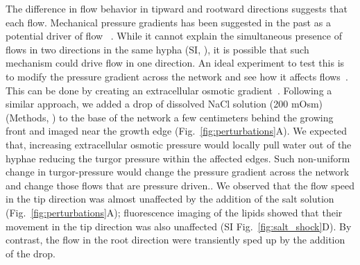 
The difference in flow behavior in tipward and rootward directions suggests that each flow. Mechanical pressure gradients has been suggested in the past as a potential driver of flow ~\cite{heaton_growth-induced_2010,lew_mass_2005,lew_how_2011}. While it cannot explain the simultaneous presence of flows in two directions in the same hypha (SI, ), it is possible that such mechanism could drive flow in one direction. 
An ideal experiment to test this is to modify the pressure gradient across the network and see how it affects flows~\cite{lew_mass_2005}. This can be done by creating an extracellular osmotic gradient~\cite{lew_mass_2005}.
Following a similar approach, we added a drop of dissolved NaCl solution (200 mOsm) (Methods, ) to the base of the network a few centimeters behind the growing front and imaged near the growth edge (Fig.~\ref{fig:perturbations}A).
We expected that, increasing extracellular osmotic pressure would locally pull water out of the hyphae reducing the turgor pressure within the affected edges. Such non-uniform change in turgor-pressure would change the pressure gradient across the network and change those flows that are pressure driven..
We observed that the flow speed in the tip direction was almost unaffected by the addition of the salt solution (Fig.~\ref{fig:perturbations}A); fluorescence imaging of the lipids showed that their movement in the tip direction was also unaffected (SI Fig.~\ref{fig:salt_shock}D).
By contrast, the flow in the root direction were transiently sped up by the addition of the drop. 


